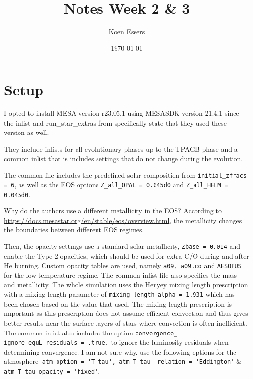 \documentclass[a4paper,10pt]{article}
\title{Notes Week 2 \& 3}
\author{Koen Essers}
\date{\today}
\begin{document}

\thispagestyle{empty}
\maketitle
\vspace{-80pt}
\tableofcontents
\section{Setup}
I opted to install MESA version r23.05.1 using MESASDK version 21.4.1 since the inlist and run\_star\_extras from \citet{rees2024a} specifically state that they used these version as well.

They include inlists for all evolutionary phases up to the TPAGB phase and a common inlist that is includes settings that do not change during the evolution. 

The common file includes the predefined solar composition from \citet{asplund2009} \lstinline[style=output, breaklines=true]|initial_zfracs = 6|, as well as the EOS options \lstinline[style=output, breaklines=true]|Z_all_OPAL = 0.045d0| and \lstinline[style=output, breaklines=true]|Z_all_HELM = 0.045d0|.

Why do the authors use a different metallicity in the EOS? According to \url{https://docs.mesastar.org/en/stable/eos/overview.html}, the metallicity changes the boundaries between different EOS regimes.

Then, the opacity settings use a standard solar metallicity, \lstinline[style=output, breaklines=true]|Zbase = 0.014| and enable the Type 2 opacities, which should be used for extra C/O during and after He burning.
Custom opacity tables are used, namely \lstinline[style=output, breaklines=true]|a09, a09.co| and \lstinline[style=output, breaklines=true]|AESOPUS| \citep{marigo2009} for the low temperature regime.
The common inlist file also specifies the mass and metallicity.
The whole simulation uses the Henyey mixing length prescription \citep{henyey1965} with a mixing length parameter of \lstinline[style=output, breaklines=true]|mixing_length_alpha = 1.931| which has been chosen based on the value that \citet{cinquegrana2022} used.
The \citet{henyey1965} mixing length prescription is important as this prescription does not assume efficient convection and thus gives better results near the surface layers of stars where convection is often inefficient.
The common inlist also includes the option \lstinline[style=output, breaklines=true]|convergence_ ignore_equL_residuals = .true.| to ignore the luminosity residuals when determining convergence. I am not sure why.
\citet{rees2024a} use the following options for the atmosphere: \lstinline[style=output, breaklines=true]|atm_option = 'T_tau', atm_T_tau_ relation = 'Eddington'| \& \lstinline[style=output, breaklines=true]|atm_T_tau_opacity = 'fixed'|.
\end{document}
